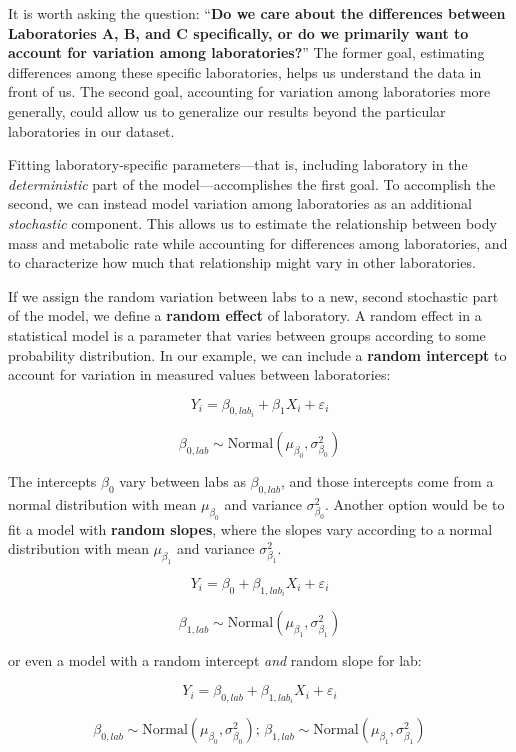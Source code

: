 \documentclass[
  13,
  letterpaper,
]{report}
\begin{document}
It is worth asking the question: ``\textbf{Do we care about the
differences between Laboratories A, B, and C specifically, or do we
primarily want to account for variation among laboratories?}'' The
former goal, estimating differences among these specific laboratories,
helps us understand the data in front of us. The second goal, accounting
for variation among laboratories more generally, could allow us to
generalize our results beyond the particular laboratories in our
dataset.

Fitting laboratory-specific parameters---that is, including laboratory
in the \emph{deterministic} part of the model---accomplishes the first
goal. To accomplish the second, we can instead model variation among
laboratories as an additional \emph{stochastic} component. This allows
us to estimate the relationship between body mass and metabolic rate
while accounting for differences among laboratories, and to characterize
how much that relationship might vary in other laboratories.

If we assign the random variation between labs to a new, second
stochastic part of the model, we define a \textbf{random effect} of
laboratory. A random effect in a statistical model is a parameter that
varies between groups according to some probability distribution. In our
example, we can include a \textbf{random intercept} to account for
variation in measured values between laboratories:

\[
Y_i=\beta_{0,lab_i}+\beta_1X_i+\varepsilon_i
\]

\[
\beta_{0,lab}\sim\text{Normal}\left(\mu_{\beta_0},\sigma^2_{\beta_0}\right)
\]

The intercepts \(\beta_0\) vary between labs as \(\beta_{0,lab}\), and
those intercepts come from a normal distribution with mean
\(\mu_{\beta_0}\) and variance \(\sigma^2_{\beta_0}\). Another option
would be to fit a model with \textbf{random slopes}, where the slopes
vary according to a normal distribution with mean \(\mu_{\beta_1}\) and
variance \(\sigma^2_{\beta_1}\).

\[
Y_i=\beta_0+\beta_{1,lab_i}X_i+\varepsilon_i
\]

\[
\beta_{1,lab}\sim\text{Normal}\left(\mu_{\beta_1},\sigma^2_{\beta_1}\right)
\]

or even a model with a random intercept \emph{and} random slope for lab:

\[
Y_i=\beta_{0,lab}+\beta_{1,lab_i}X_i+\varepsilon_i
\]

\[
\beta_{0,lab}\sim\text{Normal}\left(\mu_{\beta_0},\sigma^2_{\beta_0}\right)\text{; }\beta_{1,lab}\sim\text{Normal}\left(\mu_{\beta_1},\sigma^2_{\beta_1}\right)
\]
\end{document}
